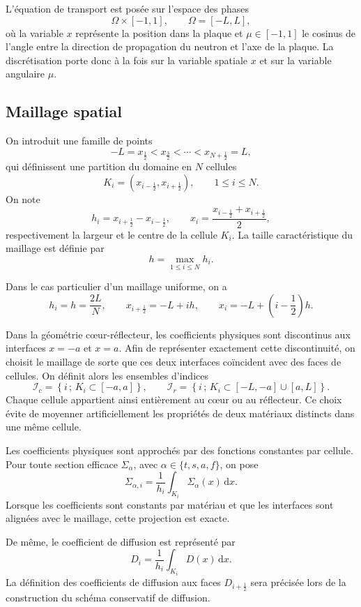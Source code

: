 \documentclass{article}
\begin{document}
L'équation de transport est posée sur l'espace des phases
\[
    \Omega\times[-1,1],
    \qquad
    \Omega=[-L,L],
\]
où la variable $x$ représente la position dans la plaque et
$\mu\in[-1,1]$ le cosinus de l'angle entre la direction de propagation
du neutron et l'axe de la plaque. La discrétisation porte donc à la fois
sur la variable spatiale $x$ et sur la variable angulaire $\mu$.

\subsection {Maillage spatial}

On introduit une famille de points
\[
    -L=x_{\frac12}
    <x_{\frac32}
    <\cdots
    <x_{N+\frac12}=L,
\]
qui définissent une partition du domaine en $N$ cellules
\[
    K_i=
    \left(x_{i-\frac12},x_{i+\frac12}\right),
    \qquad 1\leq i\leq N.
\]
On note
\[
    h_i=x_{i+\frac12}-x_{i-\frac12},
    \qquad
    x_i=\frac{x_{i-\frac12}+x_{i+\frac12}}{2},
\]
respectivement la largeur et le centre de la cellule $K_i$. La taille
caractéristique du maillage est définie par
\[
    h=\max_{1\leq i\leq N}h_i.
\]

Dans le cas particulier d'un maillage uniforme, on a
\[
    h_i=h=\frac{2L}{N},
    \qquad
    x_{i+\frac12}=-L+ih,
    \qquad
    x_i=-L+\left(i-\frac12\right)h.
\]

Dans la géométrie cœur-réflecteur, les coefficients physiques sont discontinus aux interfaces $x=-a$ et $x=a$. Afin de représenter exactement cette discontinuité, on choisit le maillage de sorte que ces deux interfaces coïncident avec des faces de cellules. On définit alors les ensembles d'indices
\[
    \mathcal{I}_c
    =
    \left\{i\,;\,K_i\subset[-a,a]\right\},
    \qquad
    \mathcal{I}_r
    =
    \left\{i\,;\,K_i\subset[-L,-a]\cup[a,L]\right\}.
\]
Chaque cellule appartient ainsi entièrement au cœur ou au réflecteur. Ce choix évite de moyenner artificiellement les propriétés de deux matériaux distincts dans une même cellule.

Les coefficients physiques sont approchés par des fonctions constantes par cellule. Pour toute section efficace $\Sigma_\alpha$, avec $\alpha\in\{t,s,a,f\}$, on pose
\[
    \Sigma_{\alpha,i} = \frac{1}{h_i} \int_{K_i}\Sigma_\alpha(x)\,\mathrm{d}x.
\]
Lorsque les coefficients sont constants par matériau et que les interfaces sont alignées avec le maillage, cette projection est exacte.

De même, le coefficient de diffusion est représenté par
\[
    D_i = \frac{1}{h_i} \int_{K_i}D(x)\,\mathrm{d}x.
\]
La définition des coefficients de diffusion aux faces $D_{i+\frac12}$ sera précisée lors de la construction du schéma conservatif de diffusion.
\end{document}
